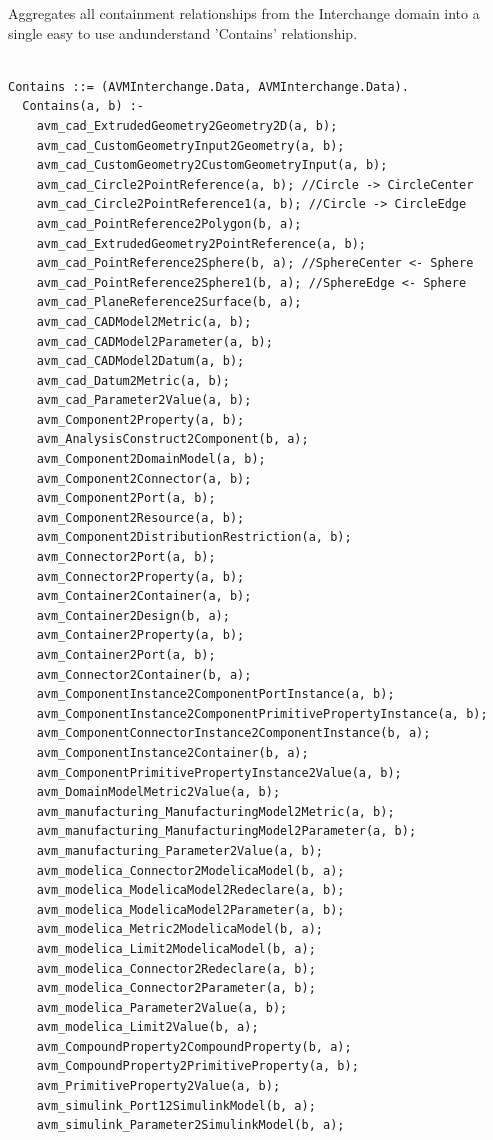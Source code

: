 Aggregates all containment relationships from the Interchange domain into a single easy to use andunderstand 'Contains' relationship.
\begin{lstlisting}

Contains ::= (AVMInterchange.Data, AVMInterchange.Data).
  Contains(a, b) :-
    avm_cad_ExtrudedGeometry2Geometry2D(a, b);
    avm_cad_CustomGeometryInput2Geometry(a, b);
    avm_cad_CustomGeometry2CustomGeometryInput(a, b);
    avm_cad_Circle2PointReference(a, b); //Circle -> CircleCenter
    avm_cad_Circle2PointReference1(a, b); //Circle -> CircleEdge
    avm_cad_PointReference2Polygon(b, a);
    avm_cad_ExtrudedGeometry2PointReference(a, b);
    avm_cad_PointReference2Sphere(b, a); //SphereCenter <- Sphere
    avm_cad_PointReference2Sphere1(b, a); //SphereEdge <- Sphere
    avm_cad_PlaneReference2Surface(b, a);
    avm_cad_CADModel2Metric(a, b);
    avm_cad_CADModel2Parameter(a, b);
    avm_cad_CADModel2Datum(a, b);
    avm_cad_Datum2Metric(a, b);
    avm_cad_Parameter2Value(a, b);
    avm_Component2Property(a, b);
    avm_AnalysisConstruct2Component(b, a);
    avm_Component2DomainModel(a, b);
    avm_Component2Connector(a, b);
    avm_Component2Port(a, b);
    avm_Component2Resource(a, b);
    avm_Component2DistributionRestriction(a, b);
    avm_Connector2Port(a, b);
    avm_Connector2Property(a, b);
    avm_Container2Container(a, b);
    avm_Container2Design(b, a);
    avm_Container2Property(a, b);
    avm_Container2Port(a, b);
    avm_Connector2Container(b, a);
    avm_ComponentInstance2ComponentPortInstance(a, b);
    avm_ComponentInstance2ComponentPrimitivePropertyInstance(a, b);
    avm_ComponentConnectorInstance2ComponentInstance(b, a);
    avm_ComponentInstance2Container(b, a);
    avm_ComponentPrimitivePropertyInstance2Value(a, b);
    avm_DomainModelMetric2Value(a, b);
    avm_manufacturing_ManufacturingModel2Metric(a, b);
    avm_manufacturing_ManufacturingModel2Parameter(a, b);
    avm_manufacturing_Parameter2Value(a, b);
    avm_modelica_Connector2ModelicaModel(b, a);
    avm_modelica_ModelicaModel2Redeclare(a, b);
    avm_modelica_ModelicaModel2Parameter(a, b);
    avm_modelica_Metric2ModelicaModel(b, a);
    avm_modelica_Limit2ModelicaModel(b, a);
    avm_modelica_Connector2Redeclare(a, b);
    avm_modelica_Connector2Parameter(a, b);
    avm_modelica_Parameter2Value(a, b);
    avm_modelica_Limit2Value(b, a);
    avm_CompoundProperty2CompoundProperty(b, a);
    avm_CompoundProperty2PrimitiveProperty(a, b);
    avm_PrimitiveProperty2Value(a, b);
    avm_simulink_Port12SimulinkModel(b, a);
    avm_simulink_Parameter2SimulinkModel(b, a);

\end{lstlisting}
